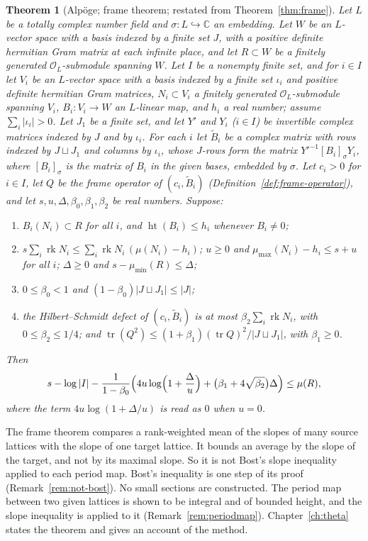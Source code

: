 \documentclass[11pt]{amsbook}
\theoremstyle{plain}
\newtheorem{theorem}{Theorem}[section]
\theoremstyle{definition}
\theoremstyle{remark}
\numberwithin{equation}{section}
\numberwithin{figure}{chapter}
\numberwithin{table}{chapter}
\renewcommand{\C}{\mathbb{C}}
\newcommand{\rk}{\operatorname{rk}}
\begin{document}
\begin{theorem}[Alp\"oge; frame theorem; restated from
Theorem~\ref{thm:frame}]
\label{bb:frame}
Let $L$ be a totally complex number field and $\sigma\colon
L\hookrightarrow\C$ an embedding. Let $W$ be an $L$-vector space with a basis
indexed by a finite
set $J$, with a positive definite hermitian Gram matrix at each
infinite place, and let $R\subset W$ be a finitely generated
$\mathcal O_L$-submodule spanning $W$. Let $I$ be a nonempty finite
set, and for $i\in I$ let $V_i$ be an $L$-vector space with a basis
indexed by a finite set $\iota_i$ and positive definite hermitian
Gram matrices, $N_i\subset V_i$ a finitely generated $\mathcal
O_L$-submodule spanning $V_i$, $B_i\colon V_i\to W$ an $L$-linear map,
and $h_i$ a real number; assume $\sum_i|\iota_i|>0$. Let $J_1$ be a
finite set, and let $Y'$ and $Y_i$ ($i\in I$) be invertible complex
matrices indexed by $J$ and by $\iota_i$. For each $i$ let
$\widetilde B_i$ be a complex matrix with rows indexed by $J\sqcup J_1$
and columns by $\iota_i$, whose $J$-rows form the matrix
$Y'^{-1}[B_i]_\sigma Y_i$, where $[B_i]_\sigma$ is the matrix of $B_i$
in the given bases, embedded by $\sigma$. Let $c_i>0$ for $i\in I$, let $Q$ be
the frame operator of $(c_i,\widetilde B_i)$
(Definition~\ref{def:frame-operator}), and let $s,u,\Delta,\beta_0,
\beta_1,\beta_2$ be real numbers. Suppose:
\begin{enumerate}[label=(\alph*)]
\item $B_i(N_i)\subset R$ for all $i$, and $\operatorname{ht}(B_i)\le
h_i$ whenever $B_i\ne0$;
\item $s\sum_i\rk N_i\le\sum_i\rk N_i\,(\mu(N_i)-h_i)$; $u\ge0$ and
$\mu_{\max}(N_i)-h_i\le s+u$ for all $i$; $\Delta\ge0$ and
$s-\mu_{\min}(R)\le\Delta$;
\item $0\le\beta_0<1$ and $(1-\beta_0)|J\sqcup J_1|\le|J|$;
\item the Hilbert--Schmidt defect of $(c_i,\widetilde B_i)$ is at most
$\beta_2\sum_i\rk N_i$, with $0\le\beta_2\le1/4$; and
$\operatorname{tr}(Q^2)\le(1+\beta_1)(\operatorname{tr}Q)^2/
|J\sqcup J_1|$, with $\beta_1\ge0$.
\end{enumerate}
Then
\[
s-\log|I|-\frac{1}{1-\beta_0}\Bigl(4u\log\Bigl(1+\frac{\Delta}{u}
\Bigr)+\bigl(\beta_1+4\sqrt{\beta_2}\bigr)\Delta\Bigr)\le\mu(R),
\]
where the term $4u\log(1+\Delta/u)$ is read as $0$ when $u=0$.
\end{theorem}

\noindent The frame theorem compares a rank-weighted mean of the
slopes of many source lattices with the slope of one target lattice.
It bounds an average by the slope of the target, and not by its
maximal slope. So it is not Bost's slope inequality applied to each
period map. Bost's inequality is one step of its proof
(Remark~\ref{rem:not-bost}). No small sections are constructed. The
period map between two given lattices is shown to be integral and of
bounded height, and the slope inequality is applied to it
(Remark~\ref{rem:periodmap}). Chapter~\ref{ch:theta} states the
theorem and gives an account of the method.
\end{document}
